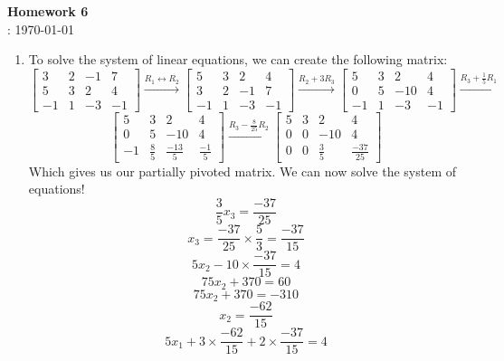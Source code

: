 \documentclass[12pt]{article}
\title{}
\author{Josh Morales}
\date{\today}
\begin{document}
\pagestyle{fancy}
\begin{center}
\textbf{\Large Homework 6} \\
: \today
\end{center}
\begin{enumerate}[leftmargin=2em]
    \item 
    To solve the system of linear equations, we can create the following matrix:
    \[
    \left[ \begin{array}{ccc|c}
        3 & 2 & -1 & 7 \\
        5 & 3 & 2 & 4 \\
        -1 & 1 & -3 & -1
    \end{array} \right]
    \xrightarrow{R_1 \leftrightarrow R_2}
    \left[ \begin{array}{ccc|c}
        5 & 3 & 2 & 4 \\
        3 & 2 & -1 & 7 \\
        -1 & 1 & -3 & -1
    \end{array} \right]
    \xrightarrow{R_2 + 3R_3}
    \left[ \begin{array}{ccc|c}
        5 & 3 & 2 & 4 \\
        0 & 5 & -10 & 4 \\
        -1 & 1 & -3 & -1
    \end{array} \right]
    \xrightarrow{R_3 + \frac{1}{5}R_1}
    \]
    \[
    \left[ \begin{array}{ccc|c}
        5 & 3 & 2 & 4 \\
        0 & 5 & -10 & 4 \\
        -1 & \frac{8}{5} & \frac{-13}{5} & \frac{-1}{5}
    \end{array} \right]
    \xrightarrow{R_3 - \frac{8}{25}R_2}
    \left[ \begin{array}{ccc|c}
        5 & 3 & 2 & 4 \\
        0 & 0 & -10 & 4 \\
        0 & 0 & \frac{3}{5} & \frac{-37}{25}
    \end{array} \right]
    \]
    Which gives us our partially pivoted matrix. We can now solve the system of equations! 
    \[\frac{3}{5}x_3 = \frac{-37}{25}\]
    \[x_3 = \frac{-37}{25}\times\frac{5}{3} = \frac{-37}{15}\]
    \[5x_2-10 \times \frac{-37}{15} = 4\]
    \[75x_2 + 370 = 60\]
    \[75x_2 + 370 = -310\]
    \[x_2 = \frac{-62}{15}\]
    \[5x_1 + 3 \times \frac{-62}{15} + 2 \times \frac{-37}{15} = 4\]

\end{enumerate}
\end{document}
